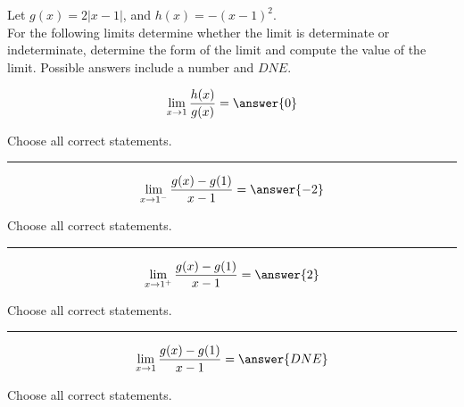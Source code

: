 \documentclass{ximera}
\author{Nela Lakos \and Kyle Parsons}
\begin{document}
\begin{exercise}

Let $g(x) = 2\left|x-1\right|$, and $h(x) = -(x-1)^2$.\\

For the following limits determine whether the limit is determinate or indeterminate, determine the form of the limit and compute the value of the limit.  Possible answers include a number and $DNE$.

\[
\lim_{x\to1}\frac{h(x)}{g(x)} = \answer{0}
\]


Choose all  correct statements.
\begin{selectAll} 
\end{selectAll}

\noindent\rule[0.5ex]{\linewidth}{0.2pt}

\[
\lim_{x\to1^-}\frac{g(x)-g(1)}{x-1} = \answer{-2}
\]

Choose all  correct statements.
\begin{selectAll} 
\end{selectAll}

\noindent\rule[0.5ex]{\linewidth}{0.2pt}

\[
\lim_{x\to1^+}\frac{g(x)-g(1)}{x-1} = \answer{2}
\]

Choose all  correct statements.
\begin{selectAll} 
\end{selectAll}

\noindent\rule[0.5ex]{\linewidth}{0.2pt}

\[
\lim_{x\to1}\frac{g(x)-g(1)}{x-1} = \answer{DNE}
\]

Choose all  correct statements.
\begin{selectAll} 
\end{selectAll}
\end{exercise}
\end{document}
